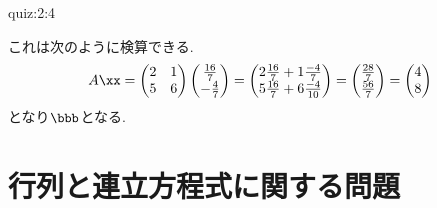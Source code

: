 \begin{answerof}{quiz:2:4}
\begin{enumerate}
  これは次のように検算できる.
  \begin{align*}
    A\xx=
    \begin{pmatrix}
      2&1\\5&6
    \end{pmatrix}
    \begin{pmatrix}
      \frac{16}{7}\\-\frac{4}{7}
    \end{pmatrix}
    =
    \begin{pmatrix}
      2\frac{16}{7}+1\frac{-4}{7}\\5\frac{16}{7}+6\frac{-4}{10}
    \end{pmatrix}
    =
    \begin{pmatrix}
      \frac{28}{7}\\\frac{56}{7}
    \end{pmatrix}
    =
    \begin{pmatrix}
      4\\8
    \end{pmatrix}
  \end{align*}
  となり$\bbb$となる.
\end{enumerate}
\end{answerof}



\section{行列と連立方程式に関する問題}


